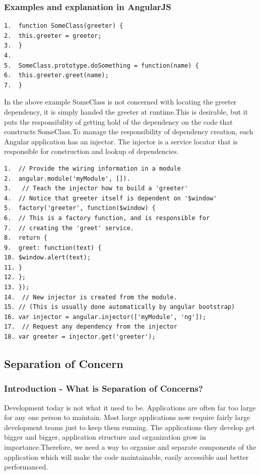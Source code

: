\documentclass[14pt,a4paper]{extreport}
\begin{document}
			\subsubsection{Examples and explanation in AngularJS}
			\begin{verbatim}
1.	function SomeClass(greeter) {
2.	this.greeter = greeter;
3.	}
4.	 
5.	SomeClass.prototype.doSomething = function(name) {
6.	this.greeter.greet(name);
7.	}
\end{verbatim}
In the above example SomeClass is not concerned with locating the greeter dependency, it is simply handed the greeter at runtime.This is desirable, but it puts the responsibility of getting hold of the dependency on the code that constructs SomeClass.To manage the responsibility of dependency creation, each Angular application has an injector. The injector is a service locator that is responsible for construction and lookup of dependencies.
\begin{verbatim}
1.	// Provide the wiring information in a module
2.	angular.module('myModule', []).
3.	 // Teach the injector how to build a 'greeter'
4.	// Notice that greeter itself is dependent on '$window'
5.	factory('greeter', function($window) {
6.	// This is a factory function, and is responsible for 
7.	// creating the 'greet' service.
8.	return {
9.	greet: function(text) {
10.	$window.alert(text);
11.	}
12.	};
13.	});
14.	 // New injector is created from the module. 
15.	// (This is usually done automatically by angular bootstrap)
16.	var injector = angular.injector(['myModule', 'ng']);
17.	 // Request any dependency from the injector
18.	var greeter = injector.get('greeter');

\end{verbatim}

		\subsection{Separation of Concern}
			\subsubsection{Introduction - What is Separation of Concerns?}
			Development today is not what it used to be. Applications are often far too large for any one person to maintain. Most large applications now require fairly large development teams just to keep them running. The applications they develop get bigger and bigger, application structure and organization grow in importance.Therefore, we need a way to organise and separate components of the application which will make the code maintainable, easily accessible and better performanced.
\\			
\end{document}
